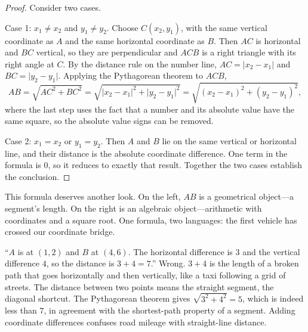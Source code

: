 \begin{proof}
Consider two cases.

Case 1: $x_{1}\ne x_{2}$ and $y_{1}\ne y_{2}$. Choose $C(x_{2},y_{1})$, with the same vertical coordinate as $A$ and the same horizontal coordinate as $B$. Then $AC$ is horizontal and $BC$ vertical, so they are perpendicular and $ACB$ is a right triangle with its right angle at $C$. By the distance rule on the number line, $AC=\lvert x_{2}-x_{1}\rvert$ and $BC=\lvert y_{2}-y_{1}\rvert$. Applying the Pythagorean theorem to $ACB$,
\[
AB=\sqrt{AC^{2}+BC^{2}}=\sqrt{\lvert x_{2}-x_{1}\rvert^{2}+\lvert y_{2}-y_{1}\rvert^{2}}
=\sqrt{(x_{2}-x_{1})^{2}+(y_{2}-y_{1})^{2}},
\]
where the last step uses the fact that a number and its absolute value have the same square, so the absolute value signs can be removed.

Case 2: $x_{1}=x_{2}$ or $y_{1}=y_{2}$. Then $A$ and $B$ lie on the same vertical or horizontal line, and their distance is the absolute coordinate difference. One term in the formula is $0$, so it reduces to exactly that result. Together the two cases establish the conclusion.
\end{proof}

\begin{center}
\end{center}

This formula deserves another look. On the left, $AB$ is a geometrical object---a segment's length. On the right is an algebraic object---arithmetic with coordinates and a square root. One formula, two languages: the first vehicle has crossed our coordinate bridge.

\begin{fanli}
``$A$ is at $(1,2)$ and $B$ at $(4,6)$. The horizontal difference is $3$ and the vertical difference $4$, so the distance is $3+4=7$.'' Wrong. $3+4$ is the length of a broken path that goes horizontally and then vertically, like a taxi following a grid of streets. The distance between two points means the straight segment, the diagonal shortcut. The Pythagorean theorem gives $\sqrt{3^{2}+4^{2}}=5$, which is indeed less than $7$, in agreement with the shortest-path property of a segment. Adding coordinate differences confuses road mileage with straight-line distance.
\end{fanli}

